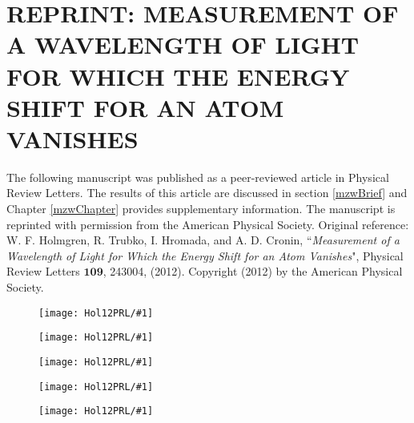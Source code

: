 \chapter{REPRINT: MEASUREMENT OF A WAVELENGTH OF LIGHT FOR WHICH THE ENERGY SHIFT FOR AN ATOM VANISHES}
\label{mzwAppendix}
The following manuscript was published as a peer-reviewed article in Physical Review Letters. The results of this article are discussed in section \ref{mzwBrief} and Chapter \ref{mzwChapter} provides supplementary information. The manuscript is reprinted with permission from the American Physical Society. Original reference: W. F. Holmgren, R. Trubko, I. Hromada, and A. D. Cronin, ``\emph{Measurement of a Wavelength of Light for Which the Energy Shift for an Atom Vanishes}", Physical Review Letters $\mathbf{109}$, 243004, (2012). Copyright (2012) by the American Physical Society.


\newcommand{\figPRL}[1]{
\begin{figure}
\texttt{[image: Hol12PRL/\#1]}
\end{figure}
} 


\figPRL{pg1}
\figPRL{pg2}
\figPRL{pg3}
\figPRL{pg4}
\figPRL{pg5}
